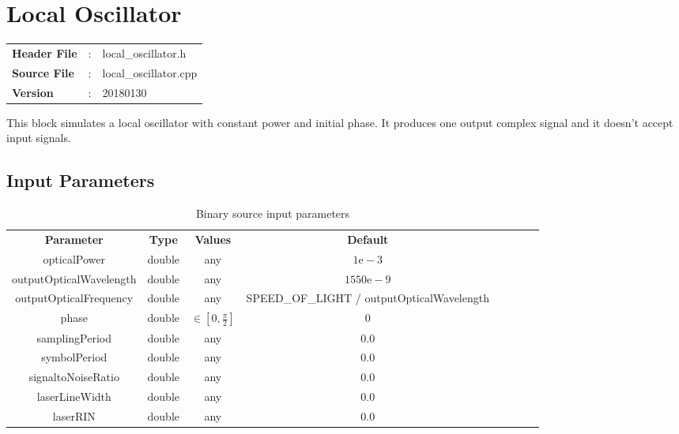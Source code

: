\clearpage

\section{Local Oscillator}

\begin{tcolorbox}	
	\begin{tabular}{p{2.75cm} p{0.2cm} p{10.5cm}} 	
		\textbf{Header File}   &:& local\_oscillator.h \\
		\textbf{Source File}   &:& local\_oscillator.cpp \\
        \textbf{Version}       &:& 20180130
	\end{tabular}
\end{tcolorbox}

This block simulates a local oscillator with constant power and initial phase. It produces one output complex signal and it doesn't accept input signals.

\subsection*{Input Parameters}

\begin{table}[h]
	\centering
	\begin{tabular}{|c|c|c|c|cccc}
		\cline{1-4}
		\textbf{Parameter} & \textbf{Type} & \textbf{Values} &   \textbf{Default}& \\ \cline{1-4}
		opticalPower & double & any & $1\text{e}-3$ \\ \cline{1-4}
		outputOpticalWavelength & double & any & $1550\text{e}-9$ \\ \cline{1-4}
		outputOpticalFrequency & double & any &  SPEED\_OF\_LIGHT / outputOpticalWavelength \\ \cline{1-4}
		phase & double & $\in \left[0,\frac{\pi}{2}\right]$ & $0$ \\ \cline{1-4}
		samplingPeriod & double & any & $0.0$ \\ \cline{1-4}
        symbolPeriod   & double & any & $0.0$ \\ \cline{1-4}
        signaltoNoiseRatio & double & any & $0.0$ \\ \cline{1-4}
        laserLineWidth & double & any & $0.0$ \\ \cline{1-4}
        laserRIN       & double & any & $0.0$ \\ \cline{1-4}
	\end{tabular}
	\caption{Binary source input parameters}
	\label{table:LO_in_par}
\end{table}

